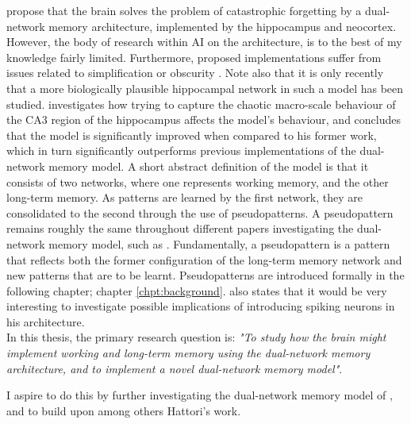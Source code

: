 
\citet{McClelland1995} propose that the brain solves the problem of catastrophic forgetting by a dual-network memory architecture, implemented by the hippocampus and neocortex. However, the body of research within AI on the architecture, is to the best of my knowledge fairly limited. Furthermore, proposed implementations suffer from issues related to simplification or obscurity \citep{French1997, French2001, Hattori2010, Hattori2014}. Note also that it is only recently that a more biologically plausible hippocampal network in such a model has been studied. \citet{Hattori2014} investigates how trying to capture the chaotic macro-scale behaviour of the CA3 region of the hippocampus affects the model's behaviour, and concludes that the model is significantly improved when compared to his former work, which in turn significantly outperforms previous implementations of the dual-network memory model. A short abstract definition of the model is that it consists of two networks, where one represents working memory, and the other long-term memory. As patterns are learned by the first network, they are consolidated to the second through the use of pseudopatterns. A pseudopattern remains roughly the same throughout different papers investigating the dual-network memory model, such as \citep{French1997, Ans2000, French2001, Hattori2010, Hattori2014}. Fundamentally, a pseudopattern is a pattern that reflects both the former configuration of the long-term memory network and new patterns that are to be learnt. Pseudopatterns are introduced formally in the following chapter; chapter \ref{chpt:background}.
\cite{Hattori2014} also states that it would be very interesting to investigate possible implications of introducing spiking neurons in his architecture.
\\

In this thesis, 
the primary research question is: \textit{"To study how the brain might implement working and long-term memory using the dual-network memory architecture, and to implement a novel dual-network memory model"}.

I aspire to do this by further investigating the dual-network memory model of \citep{Hattori2014}, and to build upon among others Hattori's work.
\\

